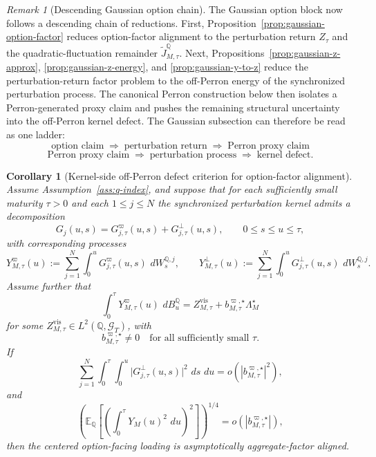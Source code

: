 \documentclass[11pt,a4paper]{amsart}
\theoremstyle{plain}
\newtheorem{corollary}[theorem]{Corollary}
\theoremstyle{definition}
\theoremstyle{remark}
\newtheorem{remark}[theorem]{Remark}
\newcommand{\QQ}{\mathbb{Q}}
\newcommand{\EE}{\mathbb{E}}
\newcommand{\cG}{\mathcal{G}}
\newcommand{\dd}{\,d}
\begin{document}
\begin{remark}[Descending Gaussian option chain]
The Gaussian option block now follows a descending chain of reductions.  First,
Proposition~\ref{prop:gaussian-option-factor} reduces option-factor alignment to the perturbation
return \(Z_\tau\) and the quadratic-fluctuation remainder \(\widetilde J_{M,\tau}^\QQ\).  Next,
Propositions~\ref{prop:gaussian-z-approx}, \ref{prop:gaussian-z-energy}, and
\ref{prop:gaussian-y-to-z} reduce the perturbation-return factor problem to the off-Perron energy
of the synchronized perturbation process.  The canonical Perron construction below then isolates a
Perron-generated proxy claim and pushes the remaining structural uncertainty into the off-Perron
kernel defect.  The Gaussian subsection can therefore be read as one ladder:
\[
        \text{option claim}
        \;\Longrightarrow\;
        \text{perturbation return}
        \;\Longrightarrow\;
        \text{Perron proxy claim}
\]
\[
        \text{Perron proxy claim}
        \;\Longrightarrow\;
        \text{perturbation process}
        \;\Longrightarrow\;
        \text{kernel defect}.
\]
\end{remark}

\begin{corollary}[Kernel-side off-Perron defect criterion for option-factor alignment]\label{cor:gaussian-kernel-to-option}
Assume Assumption~\ref{ass:q-index}, and suppose that for each sufficiently small maturity
\(\tau>0\) and each \(1\le j\le N\) the synchronized perturbation kernel admits a decomposition
\[
        G_j(u,s)=G_{j,\tau}^{\varpi}(u,s)+G_{j,\tau}^{\perp}(u,s),
        \qquad
        0\le s\le u\le \tau,
\]
with corresponding processes
\[
        Y_{M,\tau}^{\varpi}(u)
        :=
        \sum_{j=1}^N \int_0^u G_{j,\tau}^{\varpi}(u,s)\,\dd W_s^{\QQ,j},
        \qquad
        Y_{M,\tau}^{\perp}(u)
        :=
        \sum_{j=1}^N \int_0^u G_{j,\tau}^{\perp}(u,s)\,\dd W_s^{\QQ,j}.
\]
Assume further that
\[
        \int_0^\tau Y_{M,\tau}^{\varpi}(u)\,\dd B_u^\QQ
        =
        Z_{M,\tau}^{\mathrm{vis}}
        +
        b_{M,\tau}^{\varpi,\star}\Lambda_M^\star
\]
for some \(Z_{M,\tau}^{\mathrm{vis}}\in L^2(\QQ,\cG_T)\), with
\[
        b_{M,\tau}^{\varpi,\star}\neq0
        \quad\text{for all sufficiently small }\tau.
\]
If
\[
        \sum_{j=1}^N \int_0^\tau \int_0^u
        \bigl|G_{j,\tau}^{\perp}(u,s)\bigr|^2\,\dd s\,\dd u
        =
        o\!\left(|b_{M,\tau}^{\varpi,\star}|^2\right),
\]
and
\[
        \left(
                \EE_\QQ\!\left[
                        \left(
                                \int_0^\tau Y_M(u)^2\,\dd u
                        \right)^2
                \right]
        \right)^{1/4}
        =
        o\!\left(|b_{M,\tau}^{\varpi,\star}|\right),
\]
then the centered option-facing loading is asymptotically aggregate-factor aligned.
\end{corollary}
\end{document}
